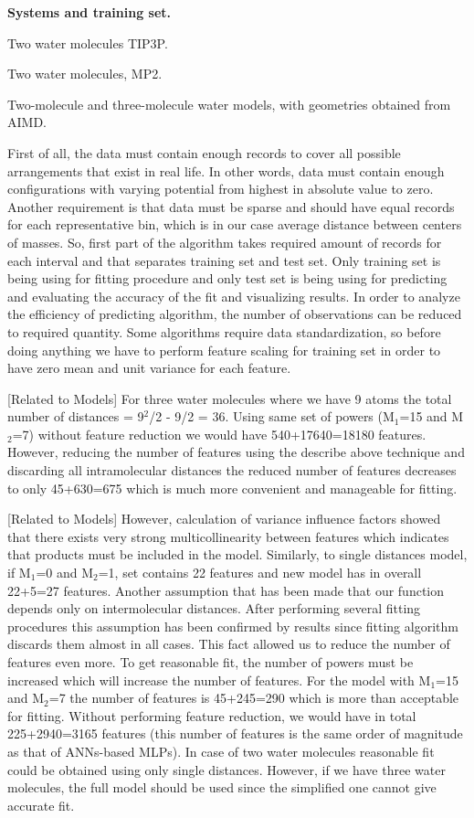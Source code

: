 \documentclass[aps,prl,reprint,amsmath,amssymb,nature]{revtex4-1}
\begin{document}
\textbf{Systems and training set.} 


Two water molecules TIP3P.

Two water molecules, MP2.

Two-molecule and three-molecule water models, with geometries obtained 
from AIMD.

First of all, the data must contain enough records to cover all possible arrangements that exist in real life. 
In other words, data must contain enough configurations with varying potential from highest in absolute value to zero. 
Another requirement is that data must be sparse and should have equal records for each representative bin, which is in our 
case average distance between centers of masses. 
So, first part of the algorithm takes required amount of records for each interval and that separates training set and test set. 
Only training set is being using for fitting procedure and only test set is being using for predicting and evaluating the accuracy of the fit and visualizing results. 
In order to analyze the efficiency of predicting algorithm, the number of observations can be reduced to required quantity. 
Some algorithms require data standardization, so before doing anything we have to perform feature scaling for training set in order to have zero mean and unit variance for each feature.

[Related to Models] For three water molecules where we have 9 atoms the total number of 
distances = 9$^{2}$/2 - 9/2 = 36. Using same set of powers (M$_{1
}$=15 and M$_{2}$=7) without feature reduction we would have 
540+17640=18180 features. However, reducing the number of features using 
the describe above technique and discarding all intramolecular distances 
the reduced number of features decreases to only 45+630=675 which is 
much more convenient and manageable for fitting.

[Related to Models] However, calculation of variance influence factors showed that there 
exists very strong multicollinearity between features which indicates 
that products must be included in the model. Similarly, to single 
distances model, if M$_{1}$=0 and M$_{2}$=1, set contains 22 
features and new model has in overall 22+5=27 features. Another 
assumption that has been made that our function depends only on 
intermolecular distances. After performing several fitting procedures 
this assumption has been confirmed by results since fitting algorithm 
discards them almost in all cases. This fact allowed us to reduce the 
number of features even more. To get reasonable fit, the number of 
powers must be increased which will increase the number of features. For 
the model with M$_{1}$=15 and M$_{2}$=7 the number of features 
is 45+245=290 which is more than acceptable for fitting. Without 
performing feature reduction, we would have in total 225+2940=3165 
features (this number of features is the same order of magnitude as that 
of ANNs-based MLPs). In case of two water molecules reasonable fit could 
be obtained using only single distances. However, if we have three water 
molecules, the full model should be used since the simplified one cannot 
give accurate fit. 
\end{document}
